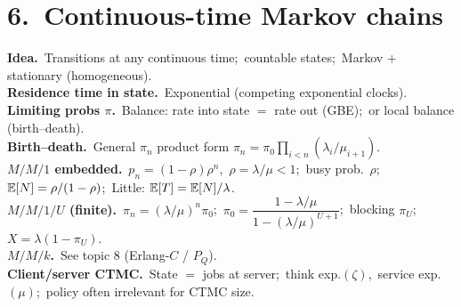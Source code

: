 \section*{6.\ Continuous-time Markov chains}
\textbf{Idea.}\ Transitions at any continuous time;\ countable states;\ Markov + stationary (homogeneous).\\
\textbf{Residence time in state.}\ Exponential (competing exponential clocks).\\
\textbf{Limiting probs $\pi$.}\ Balance: rate into state $=$ rate out (GBE);\ or local balance (birth--death).\\
\textbf{Birth--death.}\ General $\pi_n$ product form $\pi_n=\pi_0\prod_{i<n}(\lambda_i/\mu_{i+1})$.\\
\textbf{$M/M/1$ embedded.}\ $p_n=(1-\rho)\rho^n$,\ $\rho=\lambda/\mu<1$;\ busy prob.\ $\rho$;\ $\mathbb{E}[N]=\rho/(1-\rho)$;\ Little: $\mathbb{E}[T]=\mathbb{E}[N]/\lambda$.\\
\textbf{$M/M/1/U$ (finite).}\ $\pi_n=(\lambda/\mu)^n\pi_0$;\ $\pi_0=\dfrac{1-\lambda/\mu}{1-(\lambda/\mu)^{U+1}}$;\ blocking $\pi_U$;\ $X=\lambda(1-\pi_U)$.\\
\textbf{$M/M/k$.}\ See topic 8 (Erlang-$C$ / $P_Q$).\\
\textbf{Client/server CTMC.}\ State $=$ jobs at server;\ think exp.$(\zeta)$,\ service exp.$(\mu)$;\ policy often irrelevant for CTMC size.
